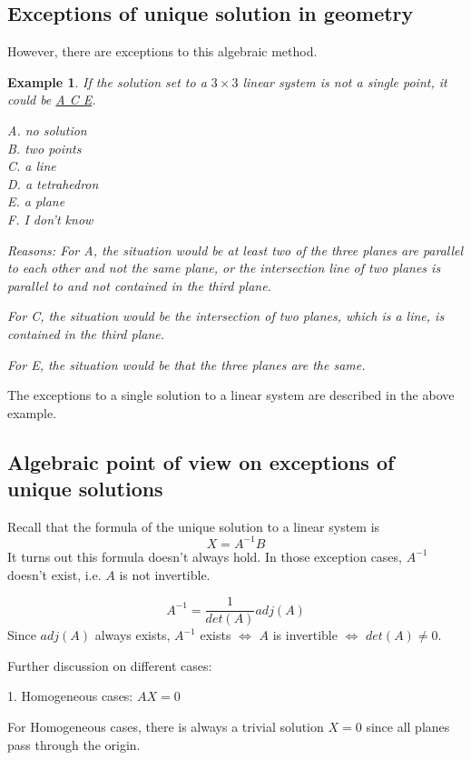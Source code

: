 \documentclass{article}
\newtheorem{example}{Example}
\begin{document}
\subsection{Exceptions of unique solution in geometry}

However, there are exceptions to this algebraic method.
\begin{example}
  If the solution set to a $3 \times 3$ linear system is not a single point, it 
  could be \underline{A C E}.

  A. no solution \\
  B. two points \\
  C. a line \\
  D. a tetrahedron \\
  E. a plane \\
  F. I don't know

  Reasons:
  For A, the situation would be at least two of the three planes are parallel to 
  each other and not the same plane, or the intersection line of two planes is 
  parallel to and not contained in the third plane.

  For C, the situation would be the intersection of two planes, which is a line, 
  is contained in the third plane.

  For E, the situation would be that the three planes are the same.
\end{example}
The exceptions to a single solution to a linear system are described in the 
above example.

\subsection{Algebraic point of view on exceptions of unique solutions}

Recall that the formula of the unique solution to a linear system is
\[
  X = A^{-1}B
\]
It turns out this formula doesn't always hold. In those exception cases, 
$A^{-1}$ doesn't exist, i.e. $A$ is not invertible.

\[
  A^{-1} = \frac{1}{det(A)}adj(A)
\]
Since $adj(A)$ always exists, $A^{-1}$ exists $\iff$ $A$ is invertible $\iff$ 
$det(A) \neq 0$.

\bigskip

Further discussion on different cases:

1. Homogeneous cases: $AX = 0$

For Homogeneous cases, there is always a trivial solution $X = 0$ since all 
planes pass through the origin.
\end{document}
